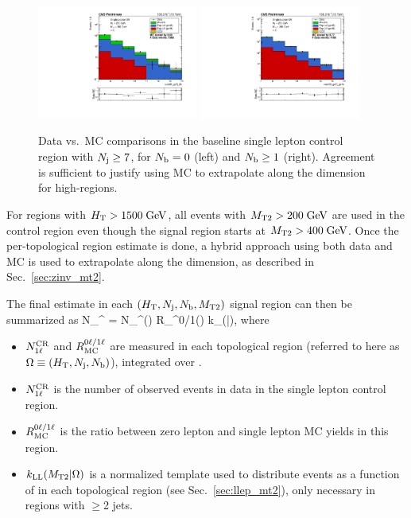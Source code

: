 \begin{figure}[ht]
  \begin{center}
    \includegraphics[width=0.47\textwidth]{figs/llep/crslbase_nJet30_ge7j_0b.pdf}
    \includegraphics[width=0.47\textwidth]{figs/llep/crslbase_nJet30_ge7j_ge1b.pdf}
    \caption{Data vs.\ MC \Nj comparisons in the baseline single lepton control region with $N_{\mathrm{j}}\geq7$,
      for $N_{\mathrm{b}}=0$ (left) and $N_{\mathrm{b}}\geq1$ (right). Agreement is sufficient to justify using MC to extrapolate
      along the \Nj dimension for high-\Nj regions.
            }
    \label{fig:llep_njextrap}
  \end{center}
\end{figure}

For regions with $H_{\mathrm{T}}>1500\;\text{Ge\hspace{-.08em}V}$, all events with
$M_{\mathrm{T2}}>200\;\text{Ge\hspace{-.08em}V}$ are used in the control region even though the signal region starts at $M_{\mathrm{T2}}>400\;\text{Ge\hspace{-.08em}V}$.
Once the per-topological region estimate is done, a hybrid approach using both data and MC is
used to extrapolate along the \mttwo dimension, as described in Sec.~\ref{sec:zinv_mt2}.

The final estimate in each $(H_{\mathrm{T}},N_{\mathrm{j}},N_{\mathrm{b}},M_{\mathrm{T2}})$ signal region can then be summarized as
\be\label{eq:llep_est}
N_{}^ = N_\mrm{1\ell}^(\Omega)\; R_^{0\ell/1\ell}(\Omega)\;
k_(\mttwo|\Omega),
\ee
where
\begin{itemize}\setlength\itemsep{0mm}
\item $N_{\mathrm{1\ell}}^{\mathrm{CR}}$ and $R_{\mathrm{MC}}^{0\ell/1\ell}$ are measured in each topological
region (referred to here as $\Omega\equiv(H_{\mathrm{T}},N_{\mathrm{j}},N_{\mathrm{b}})$), integrated over \mttwo.
\item $N_{\mathrm{1\ell}}^{\mathrm{CR}}$ is the number of observed events in data in the single lepton control region.
\item $R_{\mathrm{MC}}^{0\ell/1\ell}$ is the ratio between zero lepton and single lepton MC yields in this region.
\item $k_{\mathrm{LL}}(M_{\mathrm{T2}}|\Omega)$ is a normalized template used to distribute events as a function
of \mttwo in each topological region (see Sec.~\ref{sec:llep_mt2}), only necessary in regions with $\geq$2 jets.
\end{itemize}



